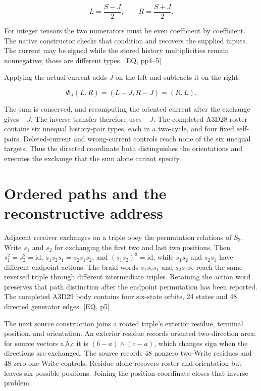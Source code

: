 \[
L=\frac{S-J}{2},\qquad R=\frac{S+J}{2}.
\]

For integer tensors the two numerators must be even coefficient by coefficient. The native constructor checks that condition and recovers the supplied inputs. The current may be signed while the stored history multiplicities remain nonnegative; those are different types. {[}EQ, pp4--5{]}

Applying the actual current adds \(J\) on the left and subtracts it on the right:

\[
\Phi_J(L,R)=(L+J,R-J)=(R,L).
\]

The sum is conserved, and recomputing the oriented current after the exchange gives \(-J\). The inverse transfer therefore uses \(-J\). The completed A3D28 roster contains six unequal history-pair types, each in a two-cycle, and four fixed self-pairs. Deleted-current and wrong-current controls reach none of the six unequal targets. Thus the directed coordinate both distinguishes the orientations and executes the exchange that the sum alone cannot specify.

\section{Ordered paths and the reconstructive address}\label{ordered-paths-and-the-reconstructive-address}

Adjacent receiver exchanges on a triple obey the permutation relations of \(S_3\). Write \(s_1\) and \(s_2\) for exchanging the first two and last two positions. Then \(s_1^2=s_2^2=\mathrm{id}\), \(s_1s_2s_1=s_2s_1s_2\), and \((s_1s_2)^3=\mathrm{id}\), while \(s_1s_2\) and \(s_2s_1\) have different endpoint actions. The braid words \(s_1s_2s_1\) and \(s_2s_1s_2\) reach the same reversed triple through different intermediate triples. Retaining the action word preserves that path distinction after the endpoint permutation has been reported. The completed A3D29 body contains four six-state orbits, 24 states and 48 directed generator edges. {[}EQ, p5{]}

The next source construction joins a rooted triple's exterior residue, terminal position, and orientation. An exterior residue records oriented two-direction area: for source vectors a,\(b\),\(c\) it is \((b-a)\wedge(c-a)\), which changes sign when the directions are exchanged. The source records 48 nonzero two-Write residues and 48 zero one-Write controls. Residue alone recovers roster and orientation but leaves six possible positions. Joining the position coordinate closes that inverse problem.

